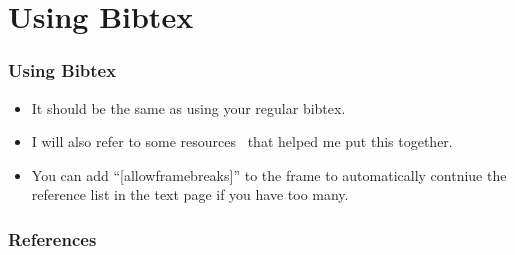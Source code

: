 \documentclass[
	11pt, %
	aspectratio=169, %
]{beamer}
\begin{document}
\section{Using Bibtex}
\begin{frame}
  \frametitle{Using Bibtex}
  \begin{itemize}
    \item It should be the same as using your regular bibtex.
    \item I will also refer to some resources~\cite{anglimAnswerImageFull2010,fiandrinoAnswerDesignCustom2013,kormyloAnswerMakeTikz2017} that helped me put this together.
    \item You can add ``[allowframebreaks]'' to the frame to automatically contniue the reference list in the text page if you have too many.
  \end{itemize}
\end{frame}

\begin{frame}[allowframebreaks]
  \frametitle{References}
  
  
\end{frame}
\end{document}
